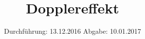 


\subject{V104}
\title{Dopplereffekt}
\date{
	Durchführung: 13.12.2016
	\hspace{4em}
	Abgabe: 10.01.2017
}


	\maketitle
	\newpage
	\tableofcontents
	\newpage
	
	
	
	
	
	
	\newpage
	
	\printbibliography

